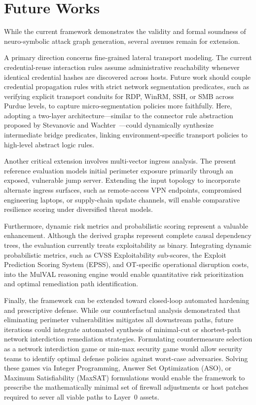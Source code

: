 \documentclass[target=mst,aauheader=aics,style=]{thud}
\begin{document}
\section{Future Works}
\label{sec:future_works}

While the current framework demonstrates the validity and formal soundness of neuro-symbolic attack graph generation, several avenues remain for extension.

A primary direction concerns fine-grained lateral transport modeling. The current credential-reuse interaction rules assume administrative reachability whenever identical credential hashes are discovered across hosts. Future work should couple credential propagation rules with strict network segmentation predicates, such as verifying explicit transport conduits for RDP, WinRM, SSH, or SMB across Purdue levels, to capture micro-segmentation policies more faithfully. Here, adopting a two-layer architecture---similar to the connector rule abstraction proposed by Stevanovic and Wachter~\cite{StevanovicWachterRAISE}---could dynamically synthesize intermediate bridge predicates, linking environment-specific transport policies to high-level abstract logic rules.

Another critical extension involves multi-vector ingress analysis. The present reference evaluation models initial perimeter exposure primarily through an exposed, vulnerable jump server. Extending the input topology to incorporate alternate ingress surfaces, such as remote-access VPN endpoints, compromised engineering laptops, or supply-chain update channels, will enable comparative resilience scoring under diversified threat models.

Furthermore, dynamic risk metrics and probabilistic scoring represent a valuable enhancement. Although the derived graphs represent complete causal dependency trees, the evaluation currently treats exploitability as binary. Integrating dynamic probabilistic metrics, such as CVSS Exploitability sub-scores, the Exploit Prediction Scoring System (EPSS), and OT-specific operational disruption costs, into the MulVAL reasoning engine would enable quantitative risk prioritization and optimal remediation path identification.

Finally, the framework can be extended toward closed-loop automated hardening and prescriptive defense. While our counterfactual analysis demonstrated that eliminating perimeter vulnerabilities mitigates all downstream paths, future iterations could integrate automated synthesis of minimal-cut or shortest-path network interdiction remediation strategies. Formulating countermeasure selection as a network interdiction game or min-max security game would allow security teams to identify optimal defense policies against worst-case adversaries. Solving these games via Integer Programming, Answer Set Optimization (ASO), or Maximum Satisfiability (MaxSAT) formulations would enable the framework to prescribe the mathematically minimal set of firewall adjustments or host patches required to sever all viable paths to Layer~0 assets.
\end{document}
